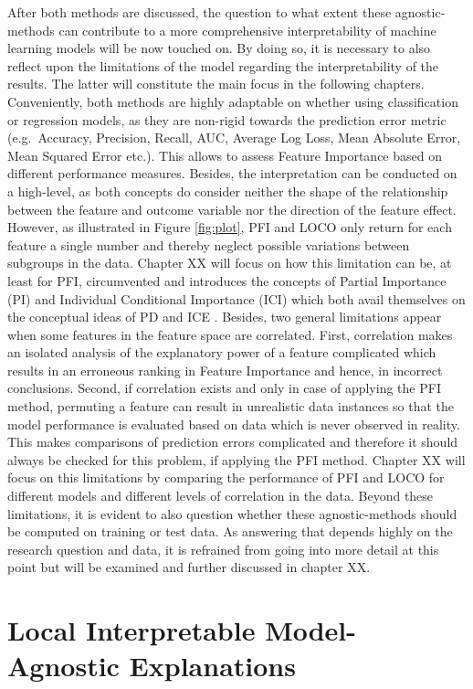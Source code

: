 \documentclass[
]{krantz}
\begin{document}
After both methods are discussed, the question to what extent these agnostic-methods can contribute to a more comprehensive interpretability of machine learning models will be now touched on. By doing so, it is necessary to also reflect upon the limitations of the model regarding the interpretability of the results. The latter will constitute the main focus in the following chapters.
Conveniently, both methods are highly adaptable on whether using classification or regression models, as they are non-rigid towards the prediction error metric (e.g.~Accuracy, Precision, Recall, AUC, Average Log Loss, Mean Absolute Error, Mean Squared Error etc.). This allows to assess Feature Importance based on different performance measures. Besides, the interpretation can be conducted on a high-level, as both concepts do consider neither the shape of the relationship between the feature and outcome variable nor the direction of the feature effect. However, as illustrated in Figure \ref{fig:plot}, PFI and LOCO only return for each feature a single number and thereby neglect possible variations between subgroups in the data. Chapter XX will focus on how this limitation can be, at least for PFI, circumvented and introduces the concepts of Partial Importance (PI) and Individual Conditional Importance (ICI) which both avail themselves on the conceptual ideas of PD and ICE \citep[see][]{casalicchio2018visualizing}. Besides, two general limitations appear when some features in the feature space are correlated. First, correlation makes an isolated analysis of the explanatory power of a feature complicated which results in an erroneous ranking in Feature Importance and hence, in incorrect conclusions. Second, if correlation exists and only in case of applying the PFI method, permuting a feature can result in unrealistic data instances so that the model performance is evaluated based on data which is never observed in reality. This makes comparisons of prediction errors complicated and therefore it should always be checked for this problem, if applying the PFI method. Chapter XX will focus on this limitations by comparing the performance of PFI and LOCO for different models and different levels of correlation in the data. Beyond these limitations, it is evident to also question whether these agnostic-methods should be computed on training or test data. As answering that depends highly on the research question and data, it is refrained from going into more detail at this point but will be examined and further discussed in chapter XX.

\hypertarget{local-interpretable-model-agnostic-explanations}{%
\chapter{Local Interpretable Model-Agnostic Explanations}\label{local-interpretable-model-agnostic-explanations}}
\end{document}
